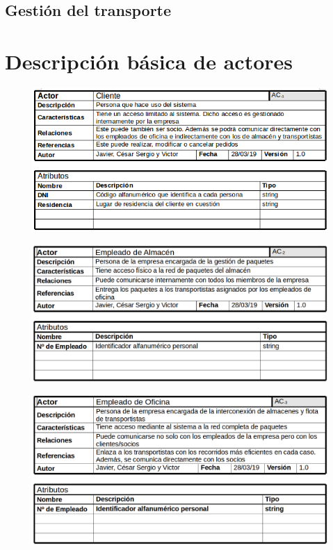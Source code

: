 \newpage

\subsection{Gestión del transporte}


\newpage

\section{Descripción básica de actores}
\begin{figure}[H]
	\centering
	\includegraphics[width=16cm]{17}
\end{figure}
\begin{figure}[H]
	\centering
	\includegraphics[width=16cm]{18}
\end{figure}
\begin{figure}[H]
	\centering
	\includegraphics[width=16cm]{19}
\end{figure}
